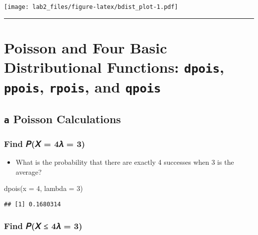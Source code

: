 \documentclass[
  12pt,
]{article}
\newenvironment{Shaded}{\begin{snugshade}}{\end{snugshade}}
\newcommand{\AttributeTok}[1]{\textcolor[rgb]{0.77,0.63,0.00}{#1}}
\newcommand{\DecValTok}[1]{\textcolor[rgb]{0.00,0.00,0.81}{#1}}
\newcommand{\FunctionTok}[1]{\textcolor[rgb]{0.00,0.00,0.00}{#1}}
\newcommand{\NormalTok}[1]{#1}
\providecommand{\tightlist}{%
  \setlength{\itemsep}{0pt}\setlength{\parskip}{0pt}}
\begin{document}
\texttt{[image: lab2\_files/figure-latex/bdist\_plot-1.pdf]}

\begin{center}\rule{0.5\linewidth}{0.5pt}\end{center}

\hypertarget{poisson-and-four-basic-distributional-functions-dpois-ppois-rpois-and-qpois}{%
\section{\texorpdfstring{Poisson and Four Basic Distributional
Functions: \texttt{dpois}, \texttt{ppois}, \texttt{rpois}, and
\texttt{qpois}}{Poisson and Four Basic Distributional Functions: dpois, ppois, rpois, and qpois}}\label{poisson-and-four-basic-distributional-functions-dpois-ppois-rpois-and-qpois}}

\hypertarget{a-poisson-calculations}{%
\subsection{\texorpdfstring{\texttt{a} Poisson
Calculations}{a Poisson Calculations}}\label{a-poisson-calculations}}

\hypertarget{find-ux1d443ux1d44b-4ux1d706-3}{%
\subsubsection{Find 𝑃(𝑋 = 4\textbar 𝜆 =
3)}\label{find-ux1d443ux1d44b-4ux1d706-3}}

\begin{itemize}
\tightlist
\item
  What is the probability that there are exactly 4 successes when 3 is
  the average?
\end{itemize}

\begin{Shaded}
\begin{Highlighting}[]
\FunctionTok{dpois}\NormalTok{(}\AttributeTok{x =} \DecValTok{4}\NormalTok{, }\AttributeTok{lambda =} \DecValTok{3}\NormalTok{)}
\end{Highlighting}
\end{Shaded}

\begin{verbatim}
## [1] 0.1680314
\end{verbatim}

\hypertarget{find-ux1d443ux1d44b-4ux1d706-3-1}{%
\subsubsection{Find 𝑃(𝑋 ≤ 4\textbar 𝜆 =
3)}\label{find-ux1d443ux1d44b-4ux1d706-3-1}}
\end{document}
